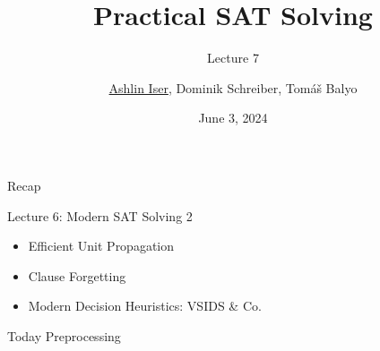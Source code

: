 \documentclass[t]{sdqbeamer}
\title[SAT Solving]{Practical SAT Solving}
\subtitle{Lecture 7}
\author{\underline{Ashlin Iser}, Dominik Schreiber, Tom\'a\v{s} Balyo}
\date{June 3, 2024}
\begin{document}
\begin{frame}
	\thispagestyle{empty}
	\titlepage
\end{frame}


\begin{frame}{Recap}
    \begin{block}{Lecture 6: Modern SAT Solving 2}
		\begin{itemize}\setlength{\itemsep}{1ex}
			\item Efficient Unit Propagation
			\item Clause Forgetting
			\item Modern Decision Heuristics: VSIDS \& Co.
		\end{itemize}
    \end{block}
	\begin{block}{Today}
        Preprocessing
	\end{block}
\end{frame}
\end{document}
